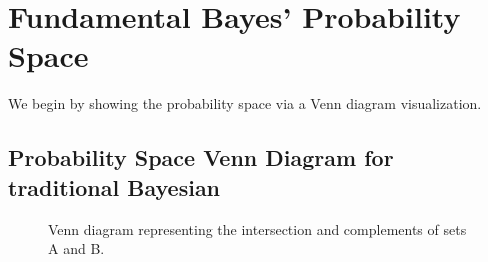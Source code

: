 \documentclass[
  12 pt,
  a4paper,
]{book}
\numberwithin{equation}{section}
\theoremstyle{plain}      %
\theoremstyle{definition} %
\theoremstyle{remark}     %
\theoremstyle{note}         %
\begin{document}
\newpage

\hypertarget{fundamental-bayes-probability-space}{%
\section{Fundamental Bayes' Probability
Space}\label{fundamental-bayes-probability-space}}

We begin by showing the probability space via a Venn diagram
visualization.

\hypertarget{probability-space-venn-diagram-for-traditional-bayesian}{%
\subsection{Probability Space Venn Diagram for traditional
Bayesian}\label{probability-space-venn-diagram-for-traditional-bayesian}}

\begin{figure}[htbp]
\centering
{}
\caption{Venn diagram representing the intersection and complements of sets A and B.}
\label{fig:venn-diagram}
\end{figure}
\end{document}
